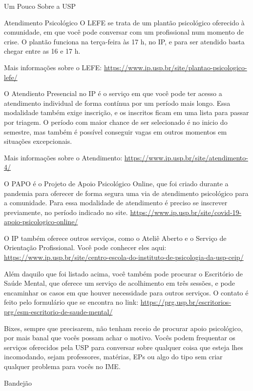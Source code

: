 \begin{secao}{Um Pouco Sobre a USP}
\begin{subsecao}{Atendimento Psicológico}
O LEFE se trata de um plantão psicológico oferecido à comunidade, em que
você pode conversar com um profissional num momento de crise. O plantão 
funciona na terça-feira às 17 h, no IP, e para ser atendido basta chegar 
entre as 16 e 17 h.

Mais informações sobre o LEFE: 
\url{https://www.ip.usp.br/site/plantao-psicologico-lefe/}

O Atendiento Presencial no IP é o serviço em que você pode ter acesso a
atendimento individual de forma contínua por um período mais longo. Essa
modalidade também exige inscrição, e os inscritos ficam em uma lista para
passar por triagem. O período com maior chance de ser selecionado é no inicio
do semestre, mas também é possível conseguir vagas em outros momentos em 
situações excepcionais. 

Mais informações sobre o Atendimento:
\url{https://www.ip.usp.br/site/atendimento-4/}

O PAPO é o Projeto de Apoio Psicológico Online, que foi criado durante a 
pandemia para oferecer de forma segura uma via de atendimento psicológico
para a comunidade. Para essa modalidade de atendimento é preciso se inscrever
previamente, no período indicado no site.
\url{https://www.ip.usp.br/site/covid-19-apoio-psicologico-online/}

O IP também oferece outros serviços, como o Ateliê Aberto e o Serviço
de Orientação Profissional. Você pode conhecer eles aqui:
\url{https://www.ip.usp.br/site/centro-escola-do-instituto-de-psicologia-da-usp-ceip/}

Além daquilo que foi listado acima, você também pode procurar o Escritório de Saúde
Mental, que oferece um serviço de acolhimento em três sessões, e pode encaminhar
os casos em que houver necessidade para outros serviços. O contato é feito pelo
formulário que se encontra no link:
\url{https://prg.usp.br/escritorios-prg/esm-escritorio-de-saude-mental/}


Bixes, sempre que precisarem, não tenham receio de procurar apoio
psicológico, por mais banal que vocês possam achar o motivo. Vocês
podem frequentar os serviços oferecidos pela USP para conversar sobre
qualquer coisa que esteja lhes incomodando, sejam professores,
matérias, EPs ou algo do tipo sem criar qualquer
problema para vocês no IME.

\end{subsecao}
\pagebreak

\begin{subsecao}{Bandejão}



\end{subsecao}
\end{secao}
